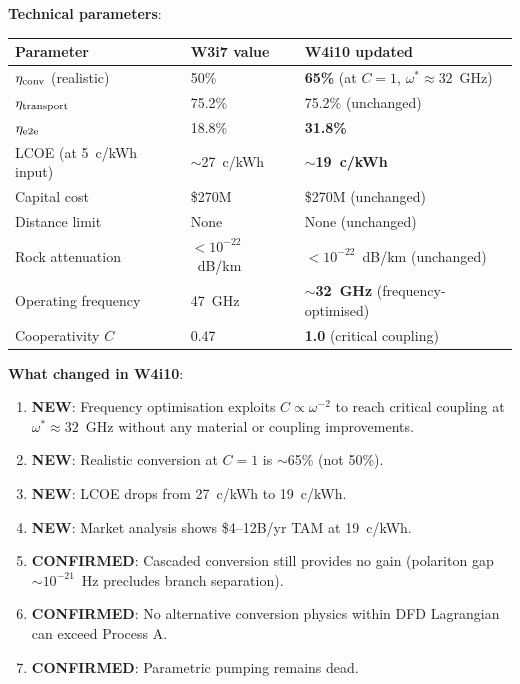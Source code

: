 \documentclass[11pt]{article}
\begin{document}
\begin{tcolorbox}[colback=green!5!white, colframe=green!60!black,
  title=\textbf{P4 Underground WPT: W4i10 Consolidated Status}]

\textbf{Technical parameters}:
\begin{center}
\begin{tabular}{lll}
\toprule
Parameter & W3i7 value & W4i10 updated \\
\midrule
$\eta_{\rm conv}$ (realistic) & 50\% & \textbf{65\%} (at $C=1$, $\omega^* \approx 32$~GHz) \\
$\eta_{\rm transport}$ & 75.2\% & 75.2\% (unchanged) \\
$\eta_{\rm e2e}$ & 18.8\% & \textbf{31.8\%} \\
LCOE (at 5~c/kWh input) & $\sim$27~c/kWh & \textbf{$\sim$19~c/kWh} \\
Capital cost & \$270M & \$270M (unchanged) \\
Distance limit & None & None (unchanged) \\
Rock attenuation & $<10^{-22}$~dB/km & $<10^{-22}$~dB/km (unchanged) \\
Operating frequency & 47~GHz & \textbf{$\sim$32~GHz} (frequency-optimised) \\
Cooperativity $C$ & 0.47 & \textbf{1.0} (critical coupling) \\
\bottomrule
\end{tabular}
\end{center}

\textbf{What changed in W4i10}:
\begin{enumerate}[nosep]
\item \textbf{NEW}: Frequency optimisation exploits $C \propto \omega^{-2}$
  to reach critical coupling at $\omega^* \approx 32$~GHz without any
  material or coupling improvements.
\item \textbf{NEW}: Realistic conversion at $C = 1$ is $\sim$65\% (not 50\%).
\item \textbf{NEW}: LCOE drops from 27~c/kWh to 19~c/kWh.
\item \textbf{NEW}: Market analysis shows \$4--12B/yr TAM at 19~c/kWh.
\item \textbf{CONFIRMED}: Cascaded conversion still provides no gain
  (polariton gap $\sim 10^{-21}$~Hz precludes branch separation).
\item \textbf{CONFIRMED}: No alternative conversion physics within DFD
  Lagrangian can exceed Process A.
\item \textbf{CONFIRMED}: Parametric pumping remains dead.
\end{enumerate}


\end{tcolorbox}
\end{document}
